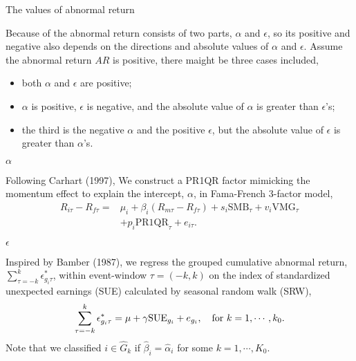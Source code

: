 \documentclass[
11pt,
ignorenonframetext,
]{beamer}
\begin{document}
\begin{frame}{The values of abnormal return}
\protect\hypertarget{the-values-of-abnormal-return}{}

Because of the abnormal return consists of two parts, \(\alpha\) and
\(\epsilon\), so its positive and negative also depends on the
directions and absolute values of \(\alpha\) and \(\epsilon\). Assume
the abnormal return \(AR\) is positive, there maight be three cases
included,

\begin{itemize}
\item
  both \(\alpha\) and \(\epsilon\) are positive;
\item
  \(\alpha\) is positive, \(\epsilon\) is negative, and the absolute
  value of \(\alpha\) is greater than \(\epsilon\)'s;
\item
  the third is the negative \(\alpha\) and the positive \(\epsilon\),
  but the absolute value of \(\epsilon\) is greater than \(\alpha\)'s.
\end{itemize}

\end{frame}

\begin{frame}{\(\alpha\)}
\protect\hypertarget{alpha}{}

Following Carhart (1997), We construct a PR1QR factor mimicking the
momentum effect to explain the intercept, \(\alpha\), in Fama-French
3-factor model, \begin{equation}
\begin{aligned}
R_{i\tau}-R_{f\tau} = & \mu_i + \beta_{i}(R_{m\tau} - R_{f\tau}) +
s_{i}\text{SMB}_\tau + v_{i}\text{VMG}_\tau  \\
& + p_i \text{PR1QR}_\tau  + e_{i\tau}.
\end{aligned}
\end{equation}

\end{frame}

\begin{frame}{\(\epsilon\)}
\protect\hypertarget{epsilon}{}

Inspired by Bamber (1987), we regress the grouped cumulative abnormal
return, \(\sum_{\tau=-k}^{k}\epsilon_{g_i\tau}^{*}\), within
event-window \(\tau=(-k,k)\) on the index of standardized unexpected
earnings (SUE) calculated by seasonal random walk (SRW),
\begin{equation}
\sum_{\tau=-k}^{k} \epsilon_{g_i\tau}^{*} = \mu + \gamma \text{SUE}_{g_i}+
e_{g_i},
\quad {\rm for} \ k=1,\cdots,k_0.
\end{equation} Note that we classified \(i \in \hat G_k\) if
\(\hat \beta_i = \hat \alpha_i\) for some \(k=1,\cdots,K_0\).

\end{frame}
\end{document}
